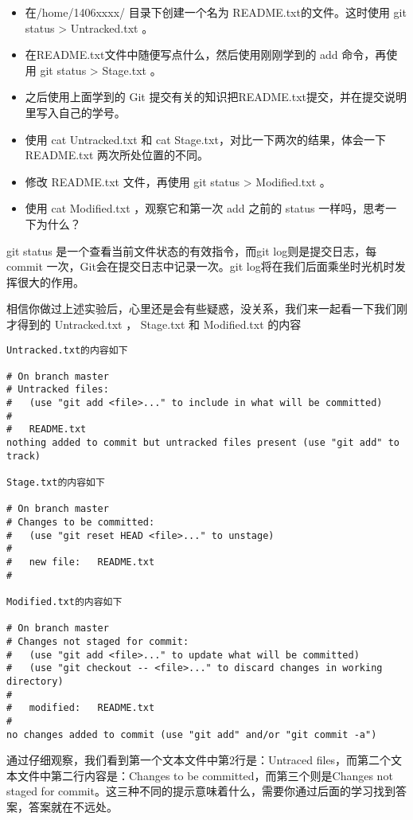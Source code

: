 \begin{exercise}
	\begin{itemize}
		\item 在/home/1406xxxx/ 目录下创建一个名为 README.txt的文件。这时使用 git status > Untracked.txt 。
		\item 在README.txt文件中随便写点什么，然后使用刚刚学到的 add 命令，再使用 git status > Stage.txt 。
		\item 之后使用上面学到的 Git 提交有关的知识把README.txt提交，并在提交说明里写入自己的学号。
		\item 使用 cat Untracked.txt 和 cat Stage.txt，对比一下两次的结果，体会一下README.txt 两次所处位置的不同。
		\item 修改 README.txt 文件，再使用 git status > Modified.txt 。
		\item 使用 cat Modified.txt ，观察它和第一次 add 之前的 status 一样吗，思考一下为什么？
	\end{itemize}
\end{exercise}

\begin{note}
git status 是一个查看当前文件状态的有效指令，而git log则是提交日志，每commit 一次，Git会在提交日志中记录一次。git log将在我们后面乘坐时光机时发挥很大的作用。
\end{note}

相信你做过上述实验后，心里还是会有些疑惑，没关系，我们来一起看一下我们刚才得到的 Untracked.txt ， Stage.txt 和 Modified.txt 的内容

\begin{verbatim}
Untracked.txt的内容如下

# On branch master
# Untracked files:
#   (use "git add <file>..." to include in what will be committed)
#
#	README.txt
nothing added to commit but untracked files present (use "git add" to track)

Stage.txt的内容如下

# On branch master
# Changes to be committed:
#   (use "git reset HEAD <file>..." to unstage)
#
#	new file:   README.txt
#

Modified.txt的内容如下

# On branch master
# Changes not staged for commit:
#   (use "git add <file>..." to update what will be committed)
#   (use "git checkout -- <file>..." to discard changes in working directory)
#
#	modified:   README.txt
#
no changes added to commit (use "git add" and/or "git commit -a")
\end{verbatim}

通过仔细观察，我们看到第一个文本文件中第2行是：Untraced files，而第二个文本文件中第二行内容是：Changes to be committed，而第三个则是Changes not staged for commit。这三种不同的提示意味着什么，需要你通过后面的学习找到答案，答案就在不远处。

